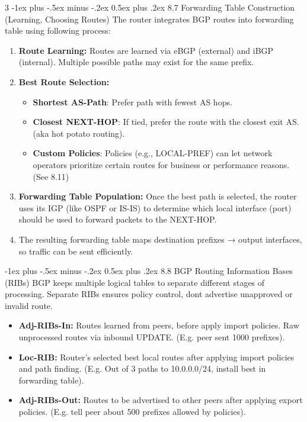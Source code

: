 \documentclass[a4paper, 9pt, landscape]{article}
\makeatletter
\renewcommand{\subsection}{\@startsection{subsubsection}{3}{0mm}%
                                {-1ex plus -.5ex minus -.2ex}%
                                {0.5ex plus .2ex}%
                                {\normalfont\small\bfseries}}
\makeatother
\begin{document}
\begin{multicols*}{3}
\subsection{8.7 Forwarding Table Construction (Learning, Choosing Routes)}
The router integrates BGP routes into forwarding table using following process:
\begin{enumerate}
    \item \textbf{Route Learning:} Routes are learned via eBGP (external) and iBGP (internal). Multiple possible paths may exist for the same prefix.
    \item \textbf{Best Route Selection:} 
    \begin{itemize}
        \item \textbf{Shortest AS-Path}: Prefer path with fewest AS hops.
        \item \textbf{Closest NEXT-HOP}: If tied, prefer the route with the closest exit AS. (aka hot potato routing).
        \item \textbf{Custom Policies}: Policies (e.g., LOCAL-PREF) can let network operators prioritize certain routes for business or performance reasons. (See 8.11)
    \end{itemize}
    \item \textbf{Forwarding Table Population:} Once the best path is selected, the router uses its IGP (like OSPF or IS-IS) to determine which local interface (port) should be used to forward packets to the NEXT-HOP.
    \item The resulting forwarding table maps destination prefixes → output interfaces, so traffic can be sent efficiently.
\end{enumerate}

\subsection{8.8 BGP Routing Information Bases (RIBs)}
BGP keeps multiple logical tables to separate different stages of processing. Separate RIBs ensures policy control, dont advertise unapproved or invalid route.
\begin{itemize}
    \item \textbf{Adj-RIBs-In:} Routes learned from peers, before apply import policies. Raw unprocessed routes via inbound UPDATE. (E.g. peer sent 1000 prefixes).
    \item \textbf{Loc-RIB:} Router's selected best local routes after applying import policies and path finding. (E.g. Out of 3 paths to 10.0.0.0/24, install best in forwarding table).
    \item \textbf{Adj-RIBs-Out:} Routes to be advertised to other peers after applying export policies. (E.g. tell peer about 500 prefixes allowed by policies).
\end{itemize}


\end{multicols*}
\end{document}
